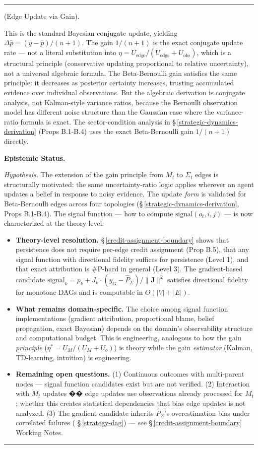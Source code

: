 \documentclass[11pt,oneside]{article}
\newcounter{claim}[section]
\renewcommand{\theclaim}{\thesection.\arabic{claim}}
\newenvironment{segment}[2]{%
  \refstepcounter{claim}%
  \bigskip\noindent\hrule\smallskip
  \noindent{\bfseries #1~\theclaim}\enskip(#2).\par\smallskip
  \noindent\ignorespaces
}{%
  \par\smallskip\noindent\hrule\bigskip
}
\newenvironment{hypothesis}[1][]{\begin{segment}{Hypothesis}{#1}}{\end{segment}}
\begin{document}
\begin{hypothesis}[Edge Update via Gain]
This is the standard Bayesian conjugate update, yielding $\Delta\hat p = (y - \hat p)/(n+1)$. The gain $1/(n+1)$ is the exact conjugate update rate — not a literal substitution into $\eta = U_{\text{edge}}/(U_{\text{edge}} + U_{\text{obs}})$, which is a structural principle (conservative updating proportional to relative uncertainty), not a universal algebraic formula. The Beta-Bernoulli gain satisfies the same principle: it decreases as posterior certainty increases, trusting accumulated evidence over individual observations. But the algebraic derivation is conjugate analysis, not Kalman-style variance ratios, because the Bernoulli observation model has different noise structure than the Gaussian case where the variance-ratio formula is exact. The sector-condition analysis in \S\,\ref{strategic-dynamics-derivation} (Props B.1-B.4) uses the exact Beta-Bernoulli gain $1/(n+1)$ directly.


\medskip\noindent\textbf{Epistemic Status.}


\textit{Hypothesis.} The extension of the gain principle from $M_t$ to $\Sigma_t$ edges is structurally motivated: the same uncertainty-ratio logic applies wherever an agent updates a belief in response to noisy evidence. The update \textit{form} is validated for Beta-Bernoulli edges across four topologies (\S\,\ref{strategic-dynamics-derivation}, Props B.1-B.4). The signal function — how to compute $\text{signal}(o_t, i, j)$ — is now characterized at the theory level:

\begin{itemize}
  \item \textbf{Theory-level resolution.} \S\,\ref{credit-assignment-boundary} shows that persistence does not require per-edge credit assignment (Prop B.5), that any signal function with directional fidelity suffices for persistence (Level 1), and that exact attribution is \#P-hard in general (Level 3). The gradient-based candidate $\text{signal}_k = p_k + J_k \cdot (y_G - \hat P_\Sigma) / \lVert\mathbf{J}\rVert^2$ satisfies directional fidelity for monotone DAGs and is computable in $O(\lvert V\rvert + \lvert E\rvert)$.
  \item \textbf{What remains domain-specific.} The choice among signal function implementations (gradient attribution, proportional blame, belief propagation, exact Bayesian) depends on the domain's observability structure and computational budget. This is engineering, analogous to how the gain \textit{principle} ($\eta^* = U_M/(U_M + U_o)$) is theory while the gain \textit{estimator} (Kalman, TD-learning, intuition) is engineering.
  \item \textbf{Remaining open questions.} (1) Continuous outcomes with multi-parent nodes — signal function candidates exist but are not verified. (2) Interaction with $M_t$ updates �� edge updates use observations already processed for $M_t$; whether this creates statistical dependencies that bias edge updates is not analyzed. (3) The gradient candidate inherits $\hat P_\Sigma$'s overestimation bias under correlated failures ( \S\,\ref{strategy-dag}) — see \S\,\ref{credit-assignment-boundary} Working Notes.
\end{itemize}




\end{hypothesis}
\end{document}

